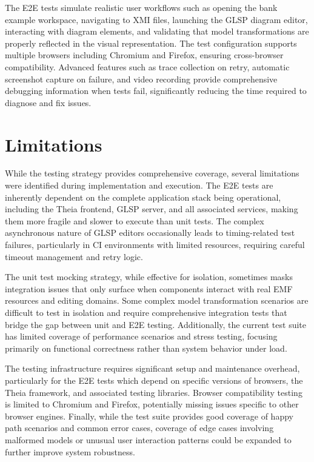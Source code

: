 The E2E tests simulate realistic user workflows such as opening the bank example workspace, navigating to XMI files, launching the GLSP diagram editor, interacting with diagram elements, and validating that model transformations are properly reflected in the visual representation. The test configuration supports multiple browsers including Chromium and Firefox, ensuring cross-browser compatibility. Advanced features such as trace collection on retry, automatic screenshot capture on failure, and video recording provide comprehensive debugging information when tests fail, significantly reducing the time required to diagnose and fix issues.

  \section{Limitations}
  \label{subsec:user-feedback}

  While the testing strategy provides comprehensive coverage, several limitations were identified during implementation and execution. The E2E tests are inherently dependent on the complete application stack being operational, including the Theia frontend, GLSP server, and all associated services, making them more fragile and slower to execute than unit tests. The complex asynchronous nature of GLSP editors occasionally leads to timing-related test failures, particularly in CI environments with limited resources, requiring careful timeout management and retry logic.

The unit test mocking strategy, while effective for isolation, sometimes masks integration issues that only surface when components interact with real EMF resources and editing domains. Some complex model transformation scenarios are difficult to test in isolation and require comprehensive integration tests that bridge the gap between unit and E2E testing. Additionally, the current test suite has limited coverage of performance scenarios and stress testing, focusing primarily on functional correctness rather than system behavior under load.

The testing infrastructure requires significant setup and maintenance overhead, particularly for the E2E tests which depend on specific versions of browsers, the Theia framework, and associated testing libraries. Browser compatibility testing is limited to Chromium and Firefox, potentially missing issues specific to other browser engines. Finally, while the test suite provides good coverage of happy path scenarios and common error cases, coverage of edge cases involving malformed models or unusual user interaction patterns could be expanded to further improve system robustness.
